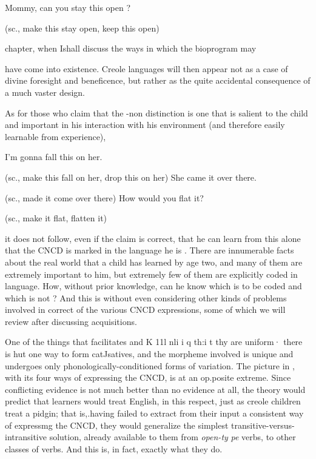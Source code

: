 \ea\label{ex:77}
Mommy, can you stay this open ?
\glt
\z

(sc., make this stay open, keep this open)

chapter, when Ishall discuss the ways in which the bioprogram may

have come into existence. Creole languages will then appear not as a case of divine foresight and beneficence, but rather as the quite acci\-dental consequence of a much vaster design.

As for those who claim that the -non distinc\-tion is one that is salient to the child and important in his interaction with his environment (and therefore easily learnable from experience),

\ea\label{ex:78}

\glt
\z

\ea\label{ex:79}

\glt
\z

\ea\label{ex:80}

\glt
\z

I'm gonna fall this on her.

(sc., make this fall on her, drop this on her) She came it over there.

(sc., made it come over there) How would you flat it?

(sc., make it flat, flatten it)

it does not follow, even if the claim is correct, that he can learn from this alone that the CNCD is marked in the language he is . There are innumerable facts about the real world that a child has learned by age two, and many of them are extremely important to him, but extremely few of them are explicitly coded in language. How, without prior knowledge, can he know which is to be coded and which is not ? And this is without even considering other kinds of problems involved in correct  of the various CNCD expressions, some of which we will review after discussing  acquisitions.

One of the things that facilitates   and K 11l nli i q th:i t th{\textquotedbl}y are uniform· there is hut one way to form catJsatives, and the morpheme involved is unique and undergoes only phonologically-conditioned forms of variation. The picture in , with its four ways of expressing the CNCD, is at an op.posite extreme. Since conflicting evidence is not much better than no evidence at all, the theory would predict that  learners would treat En\-glish, in this respect, just as creole children treat a pidgin; that is,.having failed to extract from their input a consistent way of expressmg the CNCD, they would generalize the simplest transitive-versus-intransitive solution, already available to them from \textit{open-}\textit{t}\textit{y} \textit{pe }verbs, to other classes of verbs. And this is, in fact, exactly what they do.

